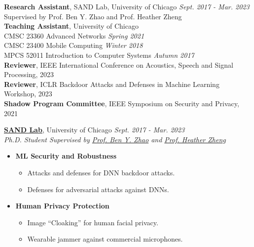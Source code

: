 \documentclass[10pt,letterpaper]{article}
\newenvironment{cvsec}[1]{\par\vspace{10pt}\begin{list}{}{\setlength{\leftmargin}{1.15in}\setlength{\labelwidth}{1.1in}\setlength{\labelsep}{0.05in}\setlength{\topsep}{0pt}}\item[{\parbox[t]{1.1in}{\raggedright\textsc{#1}}}]}{\end{list}}
\begin{document}
\begin{cvsec}{Academic\\Experience}
\textbf{Research Assistant}, SAND Lab, University of Chicago \hfill \textit{Sept. 2017 - Mar. 2023}\\
Supervised by Prof. Ben Y. Zhao and Prof. Heather Zheng\\[8pt]
\textbf{Teaching Assistant}, University of Chicago\\
CMSC 23360 Advanced Networks \hfill \textit{Spring 2021}\\
CMSC 23400 Mobile Computing \hfill \textit{Winter 2018}\\
MPCS 52011 Introduction to Computer Systems \hfill \textit{Autumn 2017}\\[8pt]
\textbf{Reviewer}, IEEE International Conference on Acoustics, Speech and Signal Processing, 2023\\[8pt]
\textbf{Reviewer}, ICLR Backdoor Attacks and Defenses in Machine Learning Workshop, 2023\\[8pt]
\textbf{Shadow Program Committee}, IEEE Symposium on Security and Privacy, 2021
\end{cvsec}

\begin{cvsec}{Research}
\href{http://sandlab.cs.uchicago.edu/}{\textbf{SAND Lab}}, University of Chicago \hfill \textit{Sept. 2017 - Mar. 2023}\\
\textit{Ph.D. Student Supervised by \href{http://people.cs.uchicago.edu/~ravenben/}{Prof. Ben Y. Zhao} and \href{http://people.cs.uchicago.edu/~htzheng/}{Prof. Heather Zheng}}
\begin{itemize}
\item \textbf{ML Security and Robustness}
  \begin{itemize}[label=--]
  \item Attacks and defenses for DNN backdoor attacks.
  \item Defenses for adversarial attacks against DNNs.
  \end{itemize}
\item \textbf{Human Privacy Protection}
  \begin{itemize}[label=--]
  \item Image ``Cloaking'' for human facial privacy.
  \item Wearable jammer against commercial microphones.
  \end{itemize}
\end{itemize}
\end{cvsec}
\end{document}
